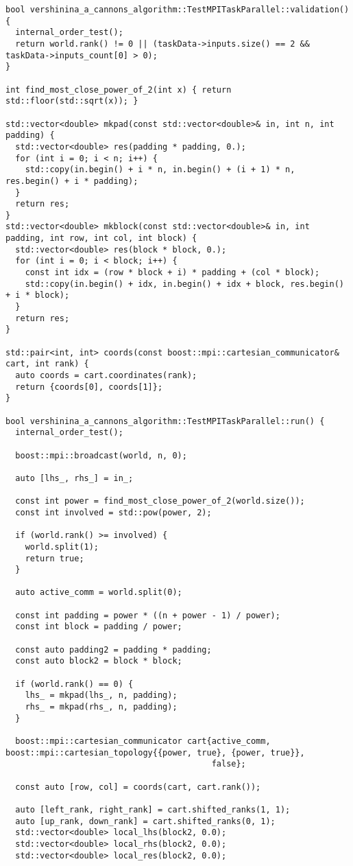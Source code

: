 \documentclass[12pt]{article}
\begin{document}
\begin{lstlisting}
bool vershinina_a_cannons_algorithm::TestMPITaskParallel::validation() {
  internal_order_test();
  return world.rank() != 0 || (taskData->inputs.size() == 2 && taskData->inputs_count[0] > 0);
}

int find_most_close_power_of_2(int x) { return std::floor(std::sqrt(x)); }

std::vector<double> mkpad(const std::vector<double>& in, int n, int padding) {
  std::vector<double> res(padding * padding, 0.);
  for (int i = 0; i < n; i++) {
    std::copy(in.begin() + i * n, in.begin() + (i + 1) * n, res.begin() + i * padding);
  }
  return res;
}
std::vector<double> mkblock(const std::vector<double>& in, int padding, int row, int col, int block) {
  std::vector<double> res(block * block, 0.);
  for (int i = 0; i < block; i++) {
    const int idx = (row * block + i) * padding + (col * block);
    std::copy(in.begin() + idx, in.begin() + idx + block, res.begin() + i * block);
  }
  return res;
}

std::pair<int, int> coords(const boost::mpi::cartesian_communicator& cart, int rank) {
  auto coords = cart.coordinates(rank);
  return {coords[0], coords[1]};
}

bool vershinina_a_cannons_algorithm::TestMPITaskParallel::run() {
  internal_order_test();

  boost::mpi::broadcast(world, n, 0);

  auto [lhs_, rhs_] = in_;

  const int power = find_most_close_power_of_2(world.size());
  const int involved = std::pow(power, 2);

  if (world.rank() >= involved) {
    world.split(1);
    return true;
  }

  auto active_comm = world.split(0);

  const int padding = power * ((n + power - 1) / power);
  const int block = padding / power;

  const auto padding2 = padding * padding;
  const auto block2 = block * block;

  if (world.rank() == 0) {
    lhs_ = mkpad(lhs_, n, padding);
    rhs_ = mkpad(rhs_, n, padding);
  }

  boost::mpi::cartesian_communicator cart{active_comm, boost::mpi::cartesian_topology{{power, true}, {power, true}},
                                          false};

  const auto [row, col] = coords(cart, cart.rank());

  auto [left_rank, right_rank] = cart.shifted_ranks(1, 1);
  auto [up_rank, down_rank] = cart.shifted_ranks(0, 1);
  std::vector<double> local_lhs(block2, 0.0);
  std::vector<double> local_rhs(block2, 0.0);
  std::vector<double> local_res(block2, 0.0);


\end{lstlisting}
\end{document}
